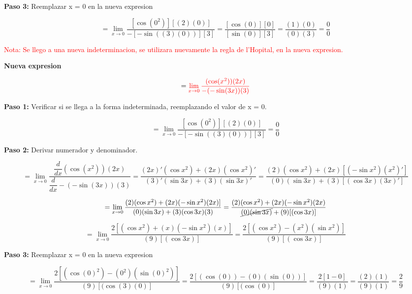 \documentclass[12pt,a4paper]{article}
\begin{document}
\textbf{Paso 3:}
\vspace{0.2cm}
Reemplazar x = 0 en la nueva expresion

\[
= \lim_{x \to 0} \frac{[\cos (0^2)][(2)(0)]}{-[-\sin((3)(0))][3]}= \frac{[\cos (0)][0]}{[\sin(0)][3]}= \frac{(1)(0)}{(0)(3)}= \frac{0}{0}
\]


\textcolor{red}{Nota: Se llego a una nueva indeterminacion, se utilizara nuevamente la regla de l'Hopital, en la nueva expresion.}

\vspace{0.2cm}

\textbf{Nueva expresion}

\[
= \textcolor{red}{\lim_{x \to 0} \frac{(\cos (x^2))(2x)}{-(-\sin(3x))(3)}}
\]


\textbf{Paso 1:}
\vspace{0.2cm}
Verificar si se llega a la forma indeterminada, reemplazando el valor de x = 0.

\[
= \lim_{x \to 0} \frac{[\cos (0^2)][(2)(0)]}{-[-\sin((3)(0))][3]}= \frac{0}{0}
\]


\newpage

\textbf{Paso 2:}
\vspace{0.2cm}
Derivar numerador y denominador.

\[
= \lim_{x \to 0} \frac{\dfrac{d}{dx} (\cos (x^2))(2x)}{\dfrac{d}{dx} -(-\sin(3x))(3)}= \frac{(2x)'(\cos x^2)+(2x)(\cos x^2)'}{(3)'(\sin 3x)+(3)(\sin 3x)'}= \frac{(2)(\cos x^2)+(2x)[(-\sin x^2)(x^2)']}{(0)(\sin 3x)+(3)[(\cos 3x)(3x)']}
\]

\[
= \lim_{x \to 0} \frac{(2)(\cos x^2)+(2x)(-\sin x^2)(2x)]}{(0)(\sin 3x)+(3)(\cos 3x)(3)} = \frac{(2)(\cos x^2)+(2x)(-\sin x^2)(2x)}{\cancel{(0)(\sin 3x)}+(9)[(\cos 3x)]}
\]

\[
= \lim_{x \to 0} \frac{2[(\cos x^2)+(x)(-\sin x^2)(x)]}{(9)[(\cos 3x)]}= \frac{2[(\cos x^2)-(x^2)(\sin x^2)]}{(9)[(\cos 3x)]}
\]

\textbf{Paso 3:}
\vspace{0.2cm}
Reemplazar x = 0 en la nueva expresion

\[
= \lim_{x \to 0} \frac{2[(\cos (0)^2)-(0^2)(\sin (0)^2)]}{(9)[(\cos (3)(0)]}=\frac{2[(\cos (0))-(0)(\sin (0))]}{(9)[(\cos (0)]}= \frac{2[1-0]}{(9)(1)}= \frac{(2)(1)}{(9)(1)}= \frac{2}{9}
\]


\vspace{0.2cm}
\newpage
\end{document}
